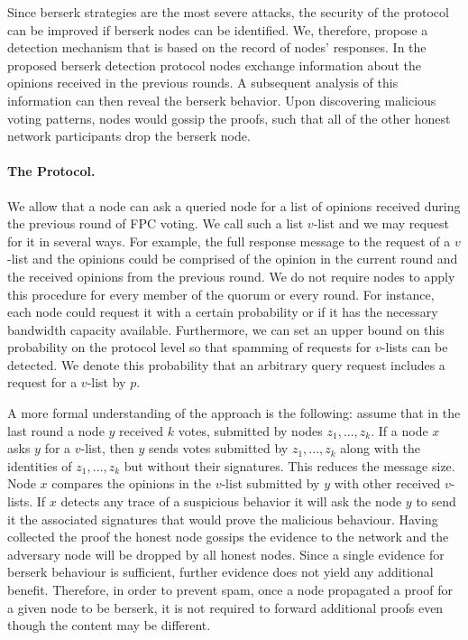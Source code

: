 \documentclass[../main.tex]{subfiles}
\begin{document}
Since berserk strategies are the most severe attacks, the security of the protocol can be improved if berserk nodes can be identified. We, therefore, propose  a detection mechanism that is based on the record of nodes’ responses.
In the proposed berserk detection protocol nodes exchange information about the opinions received in the previous rounds. A subsequent analysis of this information  can then reveal the berserk behavior. Upon discovering malicious voting patterns, nodes would gossip the proofs, such that all of the other honest network participants drop the berserk node.  

\paragraph{The Protocol.}
We allow that a node can ask a queried node for a list of opinions received during the previous round of FPC voting. We call such a list $v$-list and we may request for it in several ways. For example, the full response message to the request of a $v$-list and the opinions could be comprised of the opinion in the current round and the received opinions from the previous round. We do not require nodes to apply this procedure for every member of the quorum or every round. For instance, each node could request it with a certain probability or if it has the necessary bandwidth capacity available. Furthermore, we can set an upper bound on this probability on the protocol level so that spamming of requests for $v$-lists can be detected. We denote this probability that an arbitrary query request includes a request for a $v$-list by $p$.

A more formal understanding of the approach is the following: assume that in the last round a node $y$ received $k$ votes, submitted by nodes $z_1,...,z_k$. If a node $x$ asks $y$ for a $v$-list, then $y$ sends votes submitted by $z_1,...,z_k$ along with the identities of $z_1,...,z_k$ but without their signatures. This reduces the message size. Node $x$ compares the opinions in the $v$-list submitted by $y$ with other received $v$-lists. If $x$ detects any trace of a suspicious behavior it will ask the node $y$ to send it the associated signatures that would prove the malicious behaviour. Having collected the proof the honest node gossips the evidence to the network and the adversary node will be dropped by all honest nodes. 
Since a single evidence for berserk behaviour is sufficient, further evidence does not yield any additional benefit. Therefore, in order to prevent spam, once a node propagated a proof for a given node to be berserk, it is not required to forward additional proofs even though the content may be different. 
\end{document}
